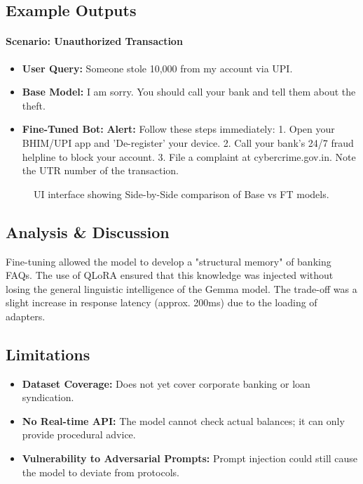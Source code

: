 \documentclass[12pt,a4paper]{article}
\begin{document}
\subsection{Example Outputs}

\paragraph{Scenario: Unauthorized Transaction}
\begin{itemize}
    \item \textbf{User Query:} Someone stole 10,000 from my account via UPI.
    \item \textbf{Base Model:} I am sorry. You should call your bank and tell them about the theft.
    \item \textbf{Fine-Tuned Bot:} \textbf{Alert:} Follow these steps immediately: 1. Open your BHIM/UPI app and 'De-register' your device. 2. Call your bank's 24/7 fraud helpline to block your account. 3. File a complaint at cybercrime.gov.in. Note the UTR number of the transaction.
\end{itemize}

\begin{figure}[H]
    \centering
    \caption{UI interface showing Side-by-Side comparison of Base vs FT models.}
\end{figure}

\subsection{Analysis \& Discussion}
Fine-tuning allowed the model to develop a "structural memory" of banking FAQs. The use of QLoRA ensured that this knowledge was injected without losing the general linguistic intelligence of the Gemma model. The trade-off was a slight increase in response latency (approx. 200ms) due to the loading of adapters.

\subsection{Limitations}
\begin{itemize}
    \item \textbf{Dataset Coverage:} Does not yet cover corporate banking or loan syndication.
    \item \textbf{No Real-time API:} The model cannot check actual balances; it can only provide procedural advice.
    \item \textbf{Vulnerability to Adversarial Prompts:} Prompt injection could still cause the model to deviate from protocols.
\end{itemize}
\end{document}
